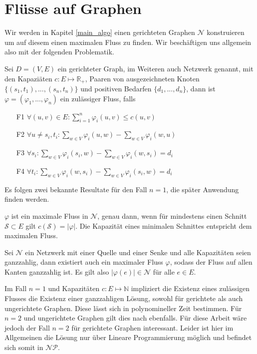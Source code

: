 \section{Flüsse auf Graphen}

Wir werden in Kapitel \ref{main_algo} einen gerichteten Graphen $\mathcal{N}$ konstruieren um auf diesem einen maximalen Fluss zu finden. Wir beschäftigen uns allgemein also mit der folgenden Problematik.

\begin{definition}\label{def_multi_flow}
Sei $D=(V,E)$ ein gerichteter Graph, im Weiteren auch Netzwerk genannt, mit den Kapaziäten $c:E\mapsto\mathbb{R}_{+}$, Paaren von ausgezeichneten Knoten $\{(s_1,t_1), ... ,(s_n,t_n)\}$ und positiven Bedarfen $\{d_1, ... ,d_n\}$, dann ist $\varphi=(\varphi_1, ... ,\varphi_n)$ ein zulässiger Fluss, falls
\begin{itemize}
\item[F1] $\forall (u,v) \in E : \sum_{i=1}^{n}{\varphi_i(u,v)} \leq c(u,v) $
\item[F2] $ \forall u \neq s_i,t_i : \sum_{w \in V} \varphi_i(u,w) - \sum_{w \in V} \varphi_i(w,u) $
\item[F3] $ \forall s_i : \sum_{w \in V} \varphi_i(s_i,w) - \sum_{w \in V} \varphi_i(w,s_i) = d_i $
\item[F4] $ \forall t_i : \sum_{w \in V} \varphi_i(w,s_i) - \sum_{w \in V} \varphi_i(s_i,w) = d_i $
\end{itemize}
\end{definition}

Es folgen zwei bekannte Resultate für den Fall $n=1$, die später Anwendung finden werden.

\begin{theorem}
$\varphi$ ist ein maximale Fluss in $\mathcal{N}$, genau dann, wenn für mindestens einen Schnitt $\mathcal{S} \subset E$ gilt $c(\mathcal{S}) = |\varphi|$. Die Kapazität eines minimalen Schnittes entspricht dem maximalen Fluss.
\end{theorem}

\begin{theorem}\label{theo_int_flow}
Sei $\mathcal{N}$ ein Netzwerk mit einer Quelle und einer Senke und alle Kapazitäten seien ganzzahlig, dann existiert auch ein maximaler Fluss $\varphi$, sodass der Fluss auf allen Kanten ganzzahlig ist. Es gilt also $|\varphi(e)| \in \mathcal{N}$ für alle $e\in E$.
\end{theorem}

\begin{remark}
Im Fall $n=1$ und Kapazitäten $c:E\mapsto\mathbb{N}$ impliziert die Existenz eines zulässigen Flusses die Existenz einer ganzzahligen Lösung, sowohl für gerichtete als auch ungerichtete Graphen. Diese lässt sich in polynomineller Zeit bestimmen. Für $n=2$ und ungerichtete Graphen gilt dies nach \cite{hu} ebenfalls. Für diese Arbeit wäre jedoch der Fall $n=2$ für gerichtete Graphen interessant. Leider ist hier im Allgemeinen die Lösung nur über Lineare Programmierung möglich und befindet sich somit in $\mathcal{NP}$.
\end{remark}